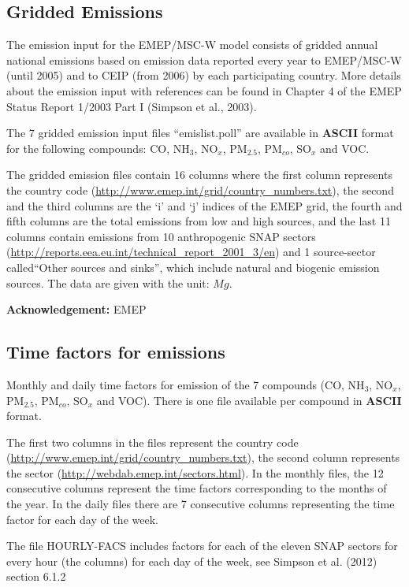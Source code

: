 \subsection{Gridded Emissions}
The emission input for the EMEP/MSC-W model consists of gridded
annual national emissions based on emission data reported every year
to EMEP/MSC-W (until 2005) 
and to CEIP (from 2006) by each
participating country. 
More details about the emission input with references can be
found in Chapter 4 of the EMEP Status Report 1/2003 Part I 
(Simpson et al., 2003).

The 7 gridded emission input files ``emislist.poll'' are available in 
{\bf ASCII} format for the following compounds: CO, NH$_{3}$,
NO$_{x}$, PM$_{2.5}$, PM$_{co}$, SO$_{x}$ and VOC.

The gridded emission files contain 16 columns where the first column 
represents the country code
(\url{http://www.emep.int/grid/country_numbers.txt}), 
the second and the third columns are the `i' and `j' indices of the
EMEP grid, the fourth and fifth columns are the total emissions from
low and high sources, and the last 11 columns contain emissions from 
10 anthropogenic SNAP sectors 
(\url{http://reports.eea.eu.int/technical_report_2001_3/en}) and 1 
source-sector called``Other sources and sinks'', which include natural and
biogenic emission sources. The data are given with the unit: $Mg$.

{\bf Acknowledgement:} EMEP

\subsection{Time factors for emissions}

Monthly and daily time factors for emission of the 7 compounds 
(CO, NH$_{3}$, NO$_{x}$, PM$_{2.5}$, PM$_{co}$, SO$_{x}$ and VOC). 
There is one file available per compound in {\bf ASCII} format. 

The first two columns in the files represent the country code \\
(\url{http://www.emep.int/grid/country_numbers.txt}), the second column 
represents the sector (\url{http://webdab.emep.int/sectors.html}). In the monthly files, 
the 12 consecutive columns represent the time factors corresponding to 
the months of the year. In the daily files there are 7 consecutive columns representing 
the time factor for each day of the week. 

The file HOURLY-FACS 
includes factors for each of the eleven SNAP sectors for every hour (the columns) for 
each day of the week, see Simpson et al. (2012) section 6.1.2

